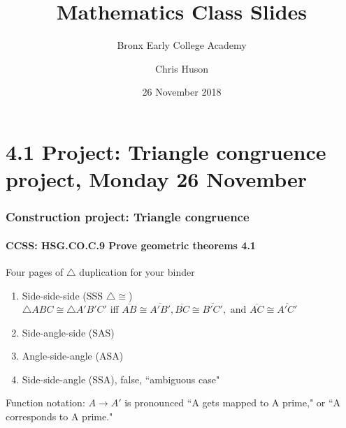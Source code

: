 \documentclass{beamer}
\title{Mathematics Class Slides}
\subtitle{Bronx Early College Academy}
\author{Chris Huson}
\date{26 November 2018} %
\begin{document}
\frame{\titlepage}
\section[Outline]{}
\frame{\tableofcontents}


\section{4.1 Project: Triangle congruence project, Monday 26 November}
  \frame
  {
    \frametitle{Construction project: Triangle congruence}
    \framesubtitle{CCSS: HSG.CO.C.9 Prove geometric theorems  \alert{4.1}}

    \begin{block}{Four pages of $\triangle$ duplication for your binder}
    \begin{enumerate}
        \item Side-side-side (SSS $\triangle \cong$)\\
        $\triangle ABC \cong \triangle A'B'C'$ iff $\overline{AB} \cong \overline{A'B'}, \overline{BC} \cong \overline{B'C'}, \text{ and } \overline{AC} \cong \overline{A'C'}$
        \item Side-angle-side (SAS)
        \item Angle-side-angle (ASA)
        \item Side-side-angle (SSA), false, ``ambiguous case"
    \end{enumerate}
    \end{block}
    Function notation: $A \rightarrow A'$ is pronounced ``A gets mapped to A prime," or ``A corresponds to A prime."

    }
\end{document}
